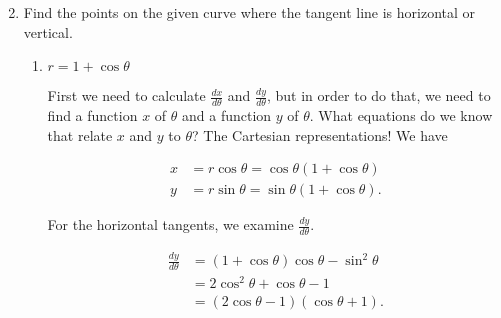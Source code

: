 \documentclass[12pt,oneside,english]{amsart}
\begin{document}
\begin{enumerate}[leftmargin=*]
\begin{enumerate}
\begin{multicols}{2}
\begin{center}
\end{center}

\columnbreak

\begin{center}
\end{center}

\end{multicols}


\end{enumerate}

\item Find the points on the given curve where the tangent line is horizontal or vertical.

\begin{enumerate}
\item $r=1+\cos\theta$

First we need to calculate $\frac{dx}{d\theta}$ and $\frac{dy}{d\theta}$, but in order to do that, we need to find a function $x$ of $\theta$ and a function $y$ of $\theta$. What equations do we know that relate $x$ and $y$ to $\theta$? The Cartesian representations! We have

\begin{align*}
x&=r\cos\theta=\cos\theta(1+\cos\theta) \\
y&=r\sin\theta=\sin\theta(1+\cos\theta).
\end{align*}

For the horizontal tangents, we examine $\frac{dy}{d\theta}$.

\begin{align*}
\frac{dy}{d\theta}&=(1+\cos\theta)\cos\theta-\sin^2\theta \\
&=2\cos^2\theta+\cos\theta-1 \\
&=(2\cos\theta-1)(\cos\theta+1).
\end{align*}


\end{enumerate}
\end{enumerate}
\end{document}
